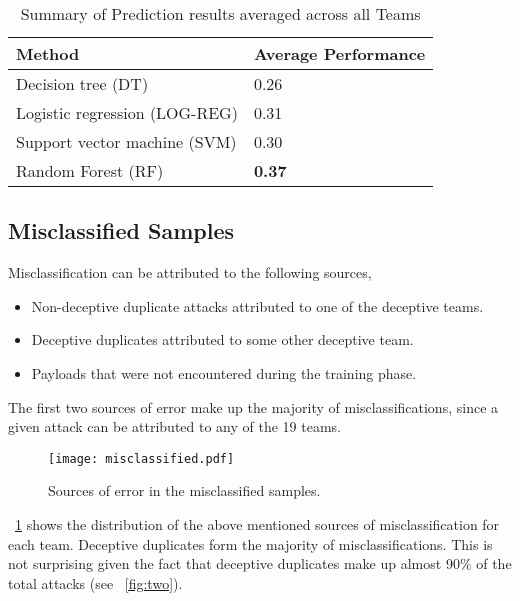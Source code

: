 \documentclass[conference]{IEEEtran}
\begin{document}
\begin{table}[h!]
	\caption{\textmd{Summary of Prediction results averaged across all Teams}}
	\label{acc}
	\centering
	\tiny
	\renewcommand{\arraystretch}{1.5}
	
	\begin{tabular}{|p{4cm}|p{2cm}|} 
		\hline
		{\bf Method} &  {\bf Average Performance} \\ \hline \hline
		\textsf{Decision tree (DT)} & 0.26\\ \hline
		\textsf{Logistic regression (LOG-REG)} & 0.31\\ \hline
		\textsf{Support vector machine (SVM)} & 0.30\\ \hline
		\textsf{Random Forest (RF)} & \textbf{0.37}\\ \hline
		
		
	\end{tabular}
	\vspace{-1em}
	
\end{table}



\subsection{Misclassified Samples}	
Misclassification can be attributed to the following sources,
\begin{itemize}
	\item Non-deceptive duplicate attacks attributed to one of the deceptive teams. 
	\item Deceptive duplicates attributed to some other deceptive team.
	\item Payloads that were not encountered during the training phase.
\end{itemize}
The first two sources of error make up the majority of misclassifications, since a given attack can be attributed to any of the 19 teams.  
	
\begin{figure}[htp!]
	\centerline{\texttt{[image: misclassified.pdf]}}
	\captionsetup{justification=centering}
	
	\caption{\textmd{Sources of error in the misclassified samples.}}
	
	\label{fig:four}
\end{figure}
\figurename~\ref{fig:four} shows the distribution of the above mentioned sources of misclassification for each team. Deceptive duplicates form the majority of misclassifications. This is not surprising given the fact that deceptive duplicates make up almost 90\% of the total attacks (see \figurename~\ref{fig:two}).
\end{document}
